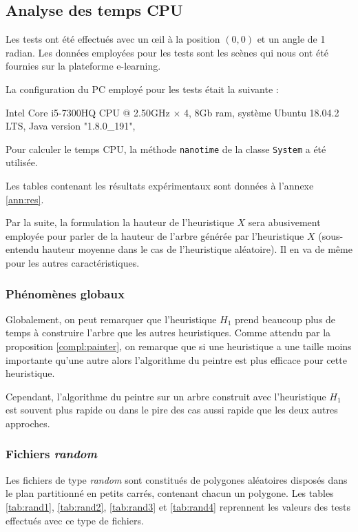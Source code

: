 \subsection{Analyse des temps CPU}
Les tests ont été effectués avec un \oe{}il à la position $(0,0)$ et un
angle de 1 radian. Les données employées pour les tests sont les scènes
qui nous ont été fournies sur la plateforme e-learning.

La configuration du PC employé pour les tests était la suivante :

\begin{center}
  Intel Core i5-7300HQ CPU @ 2.50GHz $\times$ 4,  8Gb ram, système Ubuntu 18.04.2 LTS,
  Java version "1.8.0\_191",
\end{center}
Pour calculer le temps CPU, la méthode \texttt{nanotime} de la classe
\texttt{System} a été utilisée.

Les tables contenant les résultats expérimentaux sont données
à l'annexe \ref{ann:res}.

Par la suite, la formulation \og{}la hauteur de l'heuristique
$X$\fg{} sera abusivement employée pour parler de \og{}la hauteur
de l'arbre générée par l'heuristique $X$\fg{}
(sous-entendu hauteur moyenne dans le cas de l'heuristique aléatoire).
Il en va de même pour les autres caractéristiques.

\subsubsection*{Phénomènes globaux}
Globalement, on peut remarquer que l'heuristique $H_1$ prend beaucoup plus de
temps à construire l'arbre que les autres heuristiques.
Comme attendu par la proposition \ref{compl:painter}, on remarque
que si une heuristique a une taille moins importante qu'une autre
alors l'algorithme du peintre est plus efficace pour cette heuristique.

Cependant, l'algorithme du peintre sur un arbre construit
avec l'heuristique $H_1$ est souvent plus rapide ou dans le
pire des cas aussi rapide que les deux autres approches.

\subsubsection*{Fichiers \og\emph{random}\fg}
Les fichiers de type \og\emph{random}\fg{} sont constitués de polygones
aléatoires disposés dans le plan partitionné en petits carrés, contenant
chacun un polygone. Les tables \ref{tab:rand1}, \ref{tab:rand2},
\ref{tab:rand3} et \ref{tab:rand4} reprennent
les valeurs des tests effectués avec ce type de fichiers.

